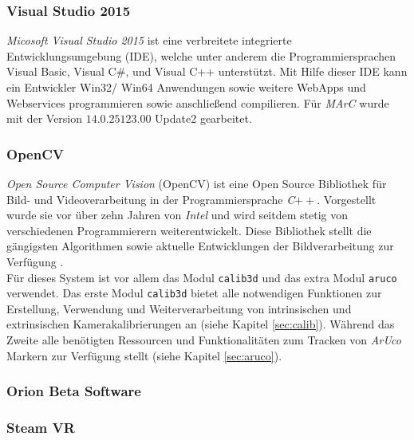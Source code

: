 \subsubsection{Visual Studio 2015}\label{sec:VisualStudio} 

\textit{Micosoft Visual Studio 2015} ist eine verbreitete integrierte Entwicklungsumgebung (IDE), welche unter anderem die Programmiersprachen Visual Basic, Visual C$\#$, und Visual C++ unterstützt. Mit Hilfe dieser IDE kann ein Entwickler Win32/ Win64 Anwendungen sowie weitere WebApps und Webservices \cite{website:VisuStud} programmieren sowie anschließend compilieren. Für \textit{MArC} wurde mit der Version $14.0.25123.00$ Update2 gearbeitet.

\subsubsection{OpenCV} \label{sec:OpenCV} 
\textit{Open Source Computer Vision} (OpenCV) ist eine Open Source Bibliothek für Bild- und Videoverarbeitung in der Programmiersprache \textit{C}$++$. Vorgestellt wurde sie vor über zehn Jahren von \textit{Intel} und wird seitdem stetig von verschiedenen Programmierern weiterentwickelt. Diese Bibliothek stellt die gängigsten Algorithmen sowie aktuelle Entwicklungen der Bildverarbeitung zur Verfügung
\cite{article:OpenCV}.\\
Für dieses System ist vor allem das Modul \texttt{calib3d} \cite{website:Calib3dDoc} und das extra Modul \texttt{aruco} \cite{website:ArucoDoc} verwendet. Das erste Modul \texttt{calib3d}  bietet alle notwendigen Funktionen zur Erstellung, Verwendung und Weiterverarbeitung von intrinsischen und extrinsischen Kamerakalibrierungen an (siehe Kapitel \ref{sec:calib}). Während das Zweite alle benötigten Ressourcen und Funktionalitäten zum Tracken von \textit{ArUco} Markern zur Verfügung stellt (siehe Kapitel \ref{sec:aruco}).

\subsubsection{Orion Beta Software} \label{OBS}

\subsubsection{Steam VR}
